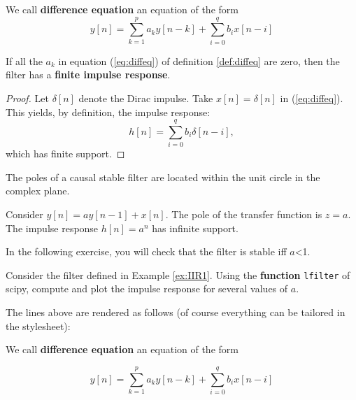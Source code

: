     \begin{listing}
\begin{definition}
\label{def:diffeq} We call \textbf{difference equation} an equation of
the form \begin{equation}
\label{eq:diffeq}
y[n]= \sum_{k=1}^{p} a_k y[n-k] + \sum_{i=0}^q b_i x[n-i]
\end{equation}
\end{definition}

\begin{property}
If all the $a_k$ in equation (\ref{eq:diffeq}) of definition
\ref{def:diffeq} are zero, then the filter has a \textbf{finite impulse
response}.
\end{property}

\begin{proof}
Let $\delta[n]$ denote the Dirac impulse. Take $x[n]=\delta[n]$ in
(\ref{eq:diffeq}). This yields, by definition, the impulse response: \begin{equation}
\label{eq:fir}
h[n]= \sum_{i=0}^q b_i \delta[n-i],
\end{equation} which has finite support.
\end{proof}

\begin{theorem}
The poles of a causal stable filter are located within the unit circle
in the complex plane.
\end{theorem}

\begin{example}
\label{ex:IIR1} Consider $y[n]= a y[n-1] + x[n]$. The pole of the
transfer function is $z=a$. The impulse response $h[n]=a^n$ has
infinite support.
\end{example}

In the following exercise, you will check that the filter is stable iff $a$<1.

\begin{exercise}
\label{ex:exofilter} Consider the filter defined in Example
\ref{ex:IIR1}. Using the \textbf{function} \texttt{lfilter} of scipy,
compute and plot the impulse response for several values of $a$.
\end{exercise}

\end{listing}

    The lines above are rendered as follows (of course everything can be
tailored in the stylesheet):

\begin{definition}
\label{def:diffeq} We call \textbf{difference equation} an equation of
the form

\begin{equation}
\label{eq:diffeq}
y[n]= \sum_{k=1}^{p} a_k y[n-k] + \sum_{i=0}^q b_i x[n-i]
\end{equation}
\end{definition}

